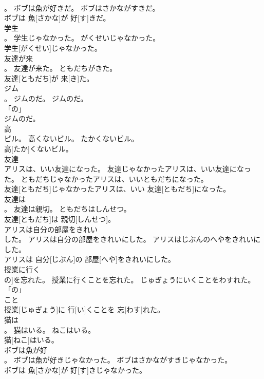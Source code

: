\documentclass[8pt]{extreport}
\begin{document}
\begin{CJK}{UTF8}{min}
\\	。	ボブは魚が好きだ。	ボブはさかながすきだ。	
\\	ボブは 魚[さかな]が 好[す]きだ。		
\\	学生
\\	。	学生じゃなかった。	がくせいじゃなかった。	
\\	学生[がくせい]じゃなかった。		
\\	友達が来
\\	。	友達が来た。	ともだちがきた。	
\\	友達[ともだち]が 来[き]た。		
\\	ジム
\\	。	ジムのだ。	ジムのだ。	
\\	「の」 
\\	ジムのだ。		
\\	高
\\	ビル。	高くないビル。	たかくないビル。	
\\	高[たか]くないビル。		
\\	友達
\\	アリスは、いい友達になった。	友達じゃなかったアリスは、いい友達になった。	ともだちじゃなかったアリスは、いいともだちになった。	
\\	友達[ともだち]じゃなかったアリスは、いい 友達[ともだち]になった。		
\\	友達は
\\	。	友達は親切。	ともだちはしんせつ。	
\\	友達[ともだち]は 親切[しんせつ]。		
\\	アリスは自分の部屋をきれい
\\	した。	アリスは自分の部屋をきれいにした。	アリスはじぶんのへやをきれいにした。	
\\	アリスは 自分[じぶん]の 部屋[へや]をきれいにした。		
\\	授業に行く
\\	の]を忘れた。	授業に行くことを忘れた。	じゅぎょうにいくことをわすれた。	
\\	「の」 
\\	こと 
\\	授業[じゅぎょう]に 行[い]くことを 忘[わす]れた。		
\\	猫は
\\	。	猫はいる。	ねこはいる。	
\\	猫[ねこ]はいる。		
\\	ボブは魚が好
\\	。	ボブは魚が好きじゃなかった。	ボブはさかながすきじゃなかった。	
\\	ボブは 魚[さかな]が 好[す]きじゃなかった。		

\end{CJK}
\end{document}
